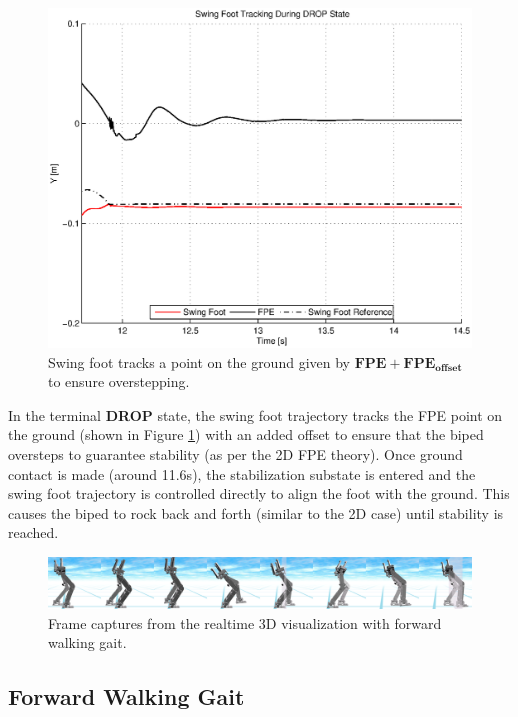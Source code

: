 \begin{figure}[!h]
	\centering
    \includegraphics[scale=0.7]{fig/simulations/sidefpetrack.eps}
  	\caption{Swing foot tracks a point on the ground given by $\mathbf{FPE} + \mathbf{FPE_{offset}}$ to ensure overstepping.}
	\label{fig:sidefpetrack}
\end{figure}


In the terminal \textbf{DROP} state, the swing foot trajectory tracks the FPE point on the ground (shown in Figure \ref{fig:sidefpetrack}) with an added offset to ensure that the biped oversteps to guarantee stability (as per the 2D FPE theory). Once ground contact is made (around 11.6s), the stabilization substate is entered and the swing foot trajectory is controlled directly to align the foot with the ground. This causes the biped to rock back and forth (similar to the 2D case) until stability is reached.

\begin{figure}[!b]
	\centering
    \includegraphics[scale=0.1]{fig/simulations/fwdsequenceside.png}
  	\caption{Frame captures from the realtime 3D visualization with forward walking gait.}
	\label{fig:fwdsequenceside}
\end{figure}

\subsection{Forward Walking Gait} %
\label{sub:forward_walking_gait}

